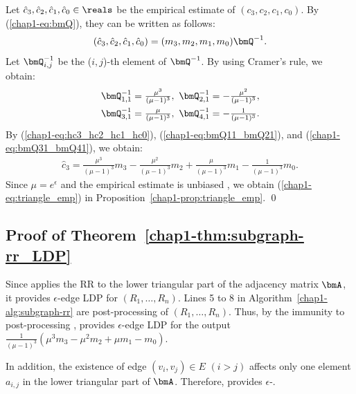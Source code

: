 Let $\hat{c}_3, \hat{c}_2, \hat{c}_1, \hat{c}_0 \in \reals$ be the empirical estimate of $(c_3, c_2, c_1, c_0)$. 
By (\ref{chap1-eq:bmQ}), they can be written as follows:
\begin{align}
(\hat{c}_3, \hat{c}_2, \hat{c}_1, \hat{c}_0) = (m_3, m_2, m_1, m_0) \bmQ^{-1}.
\label{chap1-eq:hc3_hc2_hc1_hc0}
\end{align}
Let $\bmQ_{i,j}^{-1}$ be the ($i,j$)-th element of $\bmQ^{-1}$. 
By using Cramer's rule, we obtain: 
\begin{align}
\bmQ_{1,1}^{-1} &= \textstyle{\frac{\mu^3}{(\mu-1)^3}},~ \bmQ_{2,1}^{-1} =  \textstyle{-\frac{\mu^2}{(\mu-1)^3}}, \label{chap1-eq:bmQ11_bmQ21}\\
\bmQ_{3,1}^{-1} &= \textstyle{\frac{\mu}{(\mu-1)^3}},~ \bmQ_{4,1}^{-1} = \textstyle{-\frac{1}{(\mu-1)^3}}.
\label{chap1-eq:bmQ31_bmQ41}
\end{align}
By (\ref{chap1-eq:hc3_hc2_hc1_hc0}), (\ref{chap1-eq:bmQ11_bmQ21}), and (\ref{chap1-eq:bmQ31_bmQ41}), we obtain:
\begin{align*}
\textstyle{\hat{c}_3 = \frac{\mu^3}{(\mu-1)^3} m_3 - \frac{\mu^2}{(\mu-1)^3} m_2 + \frac{\mu}{(\mu-1)^3} m_1 - \frac{1}{(\mu-1)^3} m_0.}
\end{align*}
Since $\mu = e^\epsilon$ and the empirical estimate is unbiased \cite{Kairouz_ICML16,Wang_USENIX17}, we obtain (\ref{chap1-eq:triangle_emp}) in Proposition~\ref{chap1-prop:triangle_emp}. \qed

\subsection{Proof of Theorem~\ref{chap1-thm:subgraph-rr_LDP}}
Since  applies the RR to the lower triangular part of the adjacency matrix $\bmA$, it provides $\epsilon$-edge LDP for $(R_1, \ldots, R_n)$. 
Lines 5 to 8 in Algorithm~\ref{chap1-alg:subgraph-rr} are post-processing of $(R_1, \ldots, R_n)$. 
Thus, by the immunity to post-processing \cite{DP},  provides $\epsilon$-edge LDP for the output $\frac{1}{(\mu-1)^3}(\mu^3 m_3 -\mu^2 m_2 + \mu m_1 - m_0)$. 

In addition, the existence of edge $(v_i,v_j) \in E$ $(i>j)$ affects only one element $a_{i,j}$ in the lower triangular part of $\bmA$. 
Therefore,  provides $\epsilon$-.

